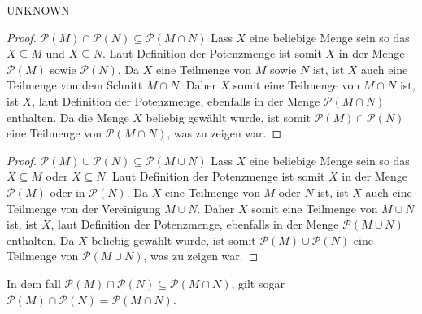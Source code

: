\documentclass{problemset}
\begin{document}
\begin{problem}{UNKNOWN}
\begin{enumerate}
          \begin{proof}
              $\mathcal{P}(M) \cap \mathcal{P}(N) \subseteq \mathcal{P}(M \cap N)$
              \newline
              Lass $X$ eine beliebige Menge sein so das $X \subseteq M$ und $X \subseteq N$.
              Laut Definition der Potenzmenge ist somit $X$ in der Menge $\mathcal{P}(M)$ sowie $\mathcal{P}(N)$.
              Da $X$ eine Teilmenge von $M$ sowie $N$ ist, ist $X$ auch eine Teilmenge von dem Schnitt $M \cap N$.
              Daher $X$ somit eine Teilmenge von $M \cap N$ ist, ist $X$, laut Definition der Potenzmenge, ebenfalls in der Menge $\mathcal{P}(M \cap N)$ enthalten.
              Da die Menge $X$ beliebig gewählt wurde, ist somit $\mathcal{P}(M) \cap \mathcal{P}(N)$ eine Teilmenge von $\mathcal{P}(M \cap N)$, was zu zeigen war.
          \end{proof}
          \begin{proof}
              $\mathcal{P}(M) \cup \mathcal{P}(N) \subseteq \mathcal{P}(M \cup N)$
              \newline
              Lass $X$ eine beliebige Menge sein so das $X \subseteq M$ oder $X \subseteq N$.
              Laut Definition der Potenzmenge ist somit $X$ in der Menge $\mathcal{P}(M)$ oder in $\mathcal{P}(N)$.
              Da $X$ eine Teilmenge von $M$ oder $N$ ist, ist $X$ auch eine Teilmenge von der Vereinigung $M \cup N$.
              Daher $X$ somit eine Teilmenge von $M \cup N$ ist, ist $X$, laut Definition der Potenzmenge, ebenfalls in der Menge $\mathcal{P}(M \cup N)$ enthalten.
              Da $X$ beliebig gewählt wurde, ist somit $\mathcal{P}(M) \cup \mathcal{P}(N)$ eine Teilmenge von $\mathcal{P}(M \cup N)$, was zu zeigen war.
          \end{proof}

          In dem fall $\mathcal{P}(M) \cap \mathcal{P}(N) \subseteq
          \mathcal{P}(M \cap N)$, gilt sogar $\mathcal{P}(M) \cap
          \mathcal{P}(N) = \mathcal{P}(M \cap N)$.
\end{enumerate}
\end{problem}
\end{document}
